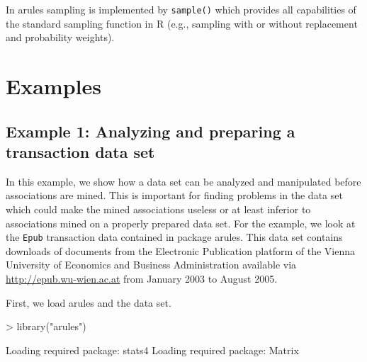 \documentclass[10pt,a4paper]{article}
\newcommand{\strong}[1]{{\normalfont\fontseries{b}\selectfont #1}}
\newcommand{\func}[1]{\mbox{\texttt{#1()}}}
\newcommand{\code}[1]{\mbox{\texttt{#1}}}
\newcommand{\pkg}[1]{\strong{#1}}
\newcommand{\proglang}[1]{\textsf{#1}}
\begin{document}
In \pkg{arules} sampling is implemented by \func{sample}
which provides all capabilities of the standard sampling function 
in \proglang{R}
(e.g., sampling with or without replacement and probability weights).




\section{Examples\label{sec:examples}}

\subsection{Example 1: Analyzing and preparing a transaction 
data set \label{sec:example-screen}}

In this example, 
we show how a data set can be analyzed and manipulated
before associations are mined.
This is important for finding problems in the data set which 
could make the mined associations useless or at least inferior
to associations mined on a properly prepared data set.
For the example,
we look at the \code{Epub} transaction data contained in
package \pkg{arules}.  This data set contains downloads of documents
from the Electronic Publication platform of the Vienna University of
Economics and Business Administration available via
\url{http://epub.wu-wien.ac.at} from January 2003 to August 2005.

First, we load \pkg{arules} and the data set.

\begin{Schunk}
\begin{Sinput}
> library("arules")
\end{Sinput}
\begin{Soutput}
Loading required package: stats4
Loading required package: Matrix
\end{Soutput}
\end{Schunk}
\end{document}
